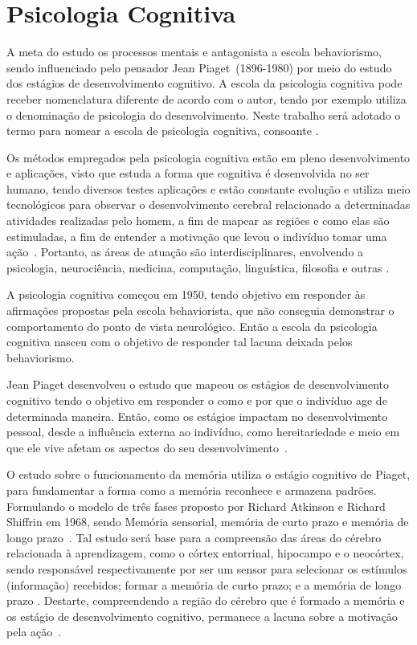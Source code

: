 \section{Psicologia Cognitiva}\label{cognitivismo}

A meta do estudo os processos mentais e antagonista a escola behaviorismo, sendo influenciado pelo pensador Jean Piaget~(1896-1980) por meio do estudo dos estágios de desenvolvimento cognitivo. 
A escola da psicologia cognitiva pode receber nomenclatura diferente de acordo com o autor, tendo por exemplo   utiliza o denominação de psicologia do desenvolvimento. 
Neste trabalho será adotado o termo para nomear a escola de psicologia cognitiva, consoante .

Os métodos empregados pela psicologia cognitiva estão em pleno desenvolvimento e aplicações, visto que estuda a forma que cognitiva é desenvolvida no ser humano, tendo diversos testes aplicações e estão constante evolução e utiliza meio tecnológicos para observar o desenvolvimento cerebral relacionado a determinadas atividades realizadas pelo homem, a fim de mapear as regiões e como elas são estimuladas, a fim de entender a motivação que levou o indivíduo tomar uma ação~\cite{nicolelis2015cerebro}. 
Portanto, as áreas de atuação são interdisciplinares, envolvendo a psicologia, neurociência, medicina, computação, linguística, filosofia e outras \cite{eysenck2017psi_cognitiva}.

A psicologia cognitiva começou em 1950, tendo objetivo em responder às afirmações propostas pela escola behaviorista, que não conseguia demonstrar o comportamento do ponto de vista neurológico.
Então a escola da psicologia cognitiva nasceu com o objetivo de responder tal lacuna deixada pelos behaviorismo.

Jean Piaget desenvolveu o estudo que mapeou os estágios de desenvolvimento cognitivo tendo o objetivo em responder o como e por que o indivíduo age de determinada maneira.
Então, como os estágios impactam no desenvolvimento pessoal, desde a influência externa ao indivíduo, como hereitariedade e meio em que ele vive afetam os aspectos do seu desenvolvimento~\cite{bock1999psicologias}. 

O estudo sobre o funcionamento da memória utiliza o estágio cognitivo de Piaget, para fundamentar a forma como a memória reconhece e armazena padrões.
Formulando o modelo de três fases proposto por Richard Atkinson e Richard Shiffrin em 1968, sendo Memória sensorial, memória de curto prazo e memória de longo prazo~\cite{laruse2009geral}.
Tal estudo será base para a compreensão das áreas do cérebro relacionada à aprendizagem, como o córtex entorrinal, hipocampo e o neocórtex, sendo responsável respectivamente por ser um sensor para selecionar os estímulos (informação) recebidos; formar a memória de curto prazo; e a memória de longo prazo
\cite{carey2014aprendemos}.
Destarte, compreendendo a região do cérebro que é formado a memória e os estágio de desenvolvimento cognitivo, permanece a lacuna sobre a motivação pela ação~\cite{sternberg2000psicologia}.


